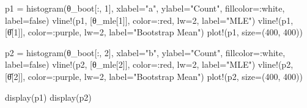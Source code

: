 \documentclass[
  letterpaper,
  DIV=11,
  numbers=noendperiod]{scrartcl}
\newenvironment{Shaded}{\begin{snugshade}}{\end{snugshade}}
\newcommand{\ConstantTok}[1]{\textcolor[rgb]{0.56,0.35,0.01}{#1}}
\newcommand{\FloatTok}[1]{\textcolor[rgb]{0.68,0.00,0.00}{#1}}
\newcommand{\FunctionTok}[1]{\textcolor[rgb]{0.28,0.35,0.67}{#1}}
\newcommand{\NormalTok}[1]{\textcolor[rgb]{0.00,0.23,0.31}{#1}}
\newcommand{\OperatorTok}[1]{\textcolor[rgb]{0.37,0.37,0.37}{#1}}
\newcommand{\StringTok}[1]{\textcolor[rgb]{0.13,0.47,0.30}{#1}}
\begin{document}
\begin{Shaded}
\begin{Highlighting}[]
\NormalTok{p1 }\OperatorTok{=} \FunctionTok{histogram}\NormalTok{(θ\_boot[}\OperatorTok{:}\NormalTok{, }\FloatTok{1}\NormalTok{], xlabel}\OperatorTok{=}\StringTok{"a"}\NormalTok{, ylabel}\OperatorTok{=}\StringTok{"Count"}\NormalTok{, fillcolor}\OperatorTok{=:}\NormalTok{white, label}\OperatorTok{=}\ConstantTok{false}\NormalTok{)}
\FunctionTok{vline!}\NormalTok{(p1, [θ\_mle[}\FloatTok{1}\NormalTok{]], color}\OperatorTok{=:}\NormalTok{red, lw}\OperatorTok{=}\FloatTok{2}\NormalTok{, label}\OperatorTok{=}\StringTok{"MLE"}\NormalTok{)}
\FunctionTok{vline!}\NormalTok{(p1, [θ̂[}\FloatTok{1}\NormalTok{]], color}\OperatorTok{=:}\NormalTok{purple, lw}\OperatorTok{=}\FloatTok{2}\NormalTok{, label}\OperatorTok{=}\StringTok{"Bootstrap Mean"}\NormalTok{)}
\FunctionTok{plot!}\NormalTok{(p1, size}\OperatorTok{=}\NormalTok{(}\FloatTok{400}\NormalTok{, }\FloatTok{400}\NormalTok{))}

\NormalTok{p2 }\OperatorTok{=} \FunctionTok{histogram}\NormalTok{(θ\_boot[}\OperatorTok{:}\NormalTok{, }\FloatTok{2}\NormalTok{], xlabel}\OperatorTok{=}\StringTok{"b"}\NormalTok{, ylabel}\OperatorTok{=}\StringTok{"Count"}\NormalTok{, fillcolor}\OperatorTok{=:}\NormalTok{white, label}\OperatorTok{=}\ConstantTok{false}\NormalTok{)}
\FunctionTok{vline!}\NormalTok{(p2, [θ\_mle[}\FloatTok{2}\NormalTok{]], color}\OperatorTok{=:}\NormalTok{red, lw}\OperatorTok{=}\FloatTok{2}\NormalTok{, label}\OperatorTok{=}\StringTok{"MLE"}\NormalTok{)}
\FunctionTok{vline!}\NormalTok{(p2, [θ̂[}\FloatTok{2}\NormalTok{]], color}\OperatorTok{=:}\NormalTok{purple, lw}\OperatorTok{=}\FloatTok{2}\NormalTok{, label}\OperatorTok{=}\StringTok{"Bootstrap Mean"}\NormalTok{)}
\FunctionTok{plot!}\NormalTok{(p2, size}\OperatorTok{=}\NormalTok{(}\FloatTok{400}\NormalTok{, }\FloatTok{400}\NormalTok{))}

\FunctionTok{display}\NormalTok{(p1)}
\FunctionTok{display}\NormalTok{(p2)}
\end{Highlighting}
\end{Shaded}
\end{document}
